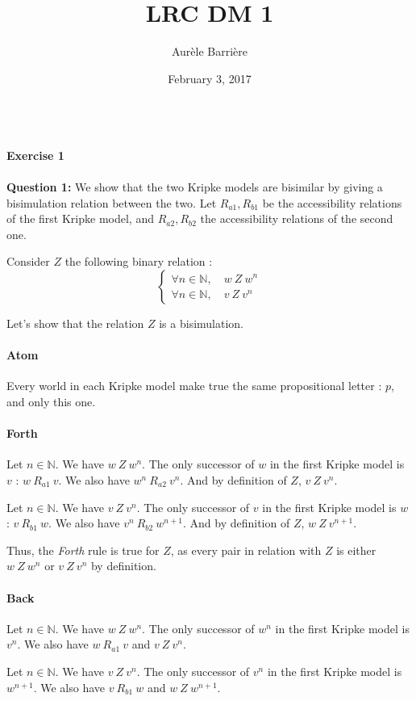 \documentclass[10pt]{article}
\author{Aur\`ele Barri\`ere}
\title{LRC DM 1}
\date{February 3, 2017}
\def\exercise#1{\ \vspace{1cm}\\\Large\textbf{Exercise #1}\normalsize\\}
\def\question#1{\ \vspace{1cm}\\\textbf{Question #1:}\quad}
\begin{document}
\maketitle

\exercise{1}
\question{1} 
We show that the two Kripke models are bisimilar by giving a bisimulation relation between the two.
Let $R_{a1}, R_{b1}$ be the accessibility relations of the first Kripke model, and $R_{a2}, R_{b2}$ the accessibility relations of the second one.

Consider $Z$ the following binary relation :
$$\left\{
\begin{array}{l}
\forall n\in\mathbb{N},\quad w\ Z\ w^n \\
\forall n\in\mathbb{N},\quad v\ Z\ v^n
\end{array} 
\right.$$

Let's show that the relation $Z$ is a bisimulation.
\paragraph{Atom} Every world in each Kripke model make true the same propositional letter  : $p$, and only this one. 

\paragraph{Forth} Let $n\in\mathbb{N}$. We have $w\ Z\ w^n$. The only successor of $w$ in the first Kripke model is $v$ : $w\ R_{a1}\ v$. We also have $w^n\ R_{a2}\ v^n$. And by definition of $Z$, $v\ Z\ v^n$.

Let $n\in\mathbb{N}$. We have $v\ Z\ v^n$. The only successor of $v$ in the first Kripke model is $w$ : $v\ R_{b1}\ w$. We also have $v^n\ R_{b2}\ w^{n+1}$. And by definition of $Z$, $w\ Z\ v^{n+1}$.

Thus, the \textit{Forth} rule is true for $Z$, as every pair in relation with $Z$ is either $w\ Z\ w^n$ or $v\ Z\ v^n$ by definition.

\paragraph{Back} Let $n\in\mathbb{N}$. We have $w\ Z\ w^n$. The only successor of $w^n$ in the first Kripke model is $v^n$. We also have $w\ R_{a1}\ v$ and $v\ Z\ v^n$. 

 Let $n\in\mathbb{N}$. We have $v\ Z\ v^n$. The only successor of $v^n$ in the first Kripke model is $w^{n+1}$. We also have $v\ R_{b1}\ w$ and $w\ Z\ w^{n+1}$. 
\end{document}
